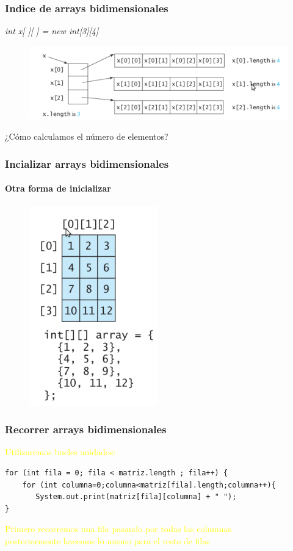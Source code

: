 \documentclass{beamer}
\begin{document}
\begin{frame}
    \frametitle{Indice de arrays bidimensionales}
    \emph{int x[ ][ ] = new int[3][4]}
\begin{figure}
\includegraphics[scale=0.7]{imagenes/indices.png}
\end{figure}
¿Cómo calculamos el número de elementos?
\end{frame}


\begin{frame}
    \frametitle{Incializar arrays bidimensionales}
    \framesubtitle{Otra forma de inicializar}
\begin{figure}
\includegraphics[scale=0.7]{imagenes/inicializar.png}
\end{figure}
\end{frame}

\begin{frame}[fragile]
\frametitle{Recorrer arrays bidimensionales}
\textcolor{yellow}{Utilizaremos bucles anidados:}
\begin{scriptsize}
\begin{verbatim}
for (int fila = 0; fila < matriz.length ; fila++) {
    for (int columna=0;columna<matriz[fila].length;columna++){
       System.out.print(matriz[fila][columna] + " ");
}
\end{verbatim}
\end{scriptsize}
\textcolor{yellow}{Primero recorremos una fila pasando por todas las columnas}\\
\textcolor{yellow}{posteriormente hacemos lo mismo para el resto de filas}
\end{frame}
\end{document}
